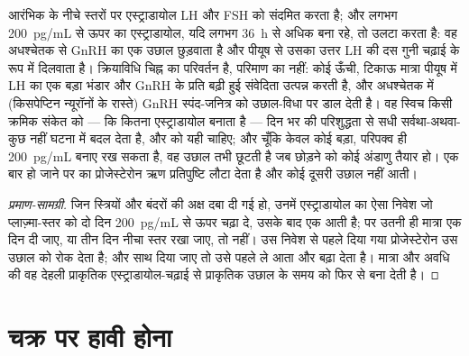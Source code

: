 \begin{theorem}[ऋण से धन प्रतिपुष्टि तक का स्विच]\label{thm:b2:reproductive-hormones:switch}
आरंभिक  के नीचे स्तरों पर एस्ट्राडायोल
LH और FSH को संदमित करता है; और लगभग \qty{200}{pg/mL} से ऊपर का
एस्ट्राडायोल, यदि लगभग \qty{36}{h} से अधिक बना रहे, तो उलटा करता है:
वह अधश्चेतक से GnRH का एक उछाल छुड़वाता है और पीयूष से उसका उत्तर
LH की दस गुनी चढ़ाई के रूप में दिलवाता है। क्रियाविधि चिह्न का परिवर्तन
है, परिमाण का नहीं: कोई ऊँची, टिकाऊ मात्रा पीयूष में LH का एक
बड़ा भंडार और GnRH के प्रति बढ़ी हुई संवेदिता उत्पन्न करती है, और
अधश्चेतक में (किसपेप्टिन न्यूरॉनों के रास्ते) GnRH स्पंद-जनित्र को
उछाल-विधा पर डाल देती है। वह स्विच किसी क्रमिक संकेत को --- कि
 कितना एस्ट्राडायोल बनाता है --- दिन भर की परिशुद्धता से
सधी सर्वथा-अथवा-कुछ नहीं घटना में बदल देता है, और 
को यही चाहिए; और चूँकि केवल कोई बड़ा, परिपक्व  ही
\qty{200}{pg/mL} बनाए रख सकता है, वह उछाल तभी छूटती है जब छोड़ने को कोई
अंडाणु तैयार हो। एक बार  हो जाने पर  का
प्रोजेस्टेरोन ऋण प्रतिपुष्टि लौटा देता है और कोई दूसरी उछाल नहीं
आती।
\end{theorem}
\begin{proof}[प्रमाण-सामग्री]
जिन स्त्रियों और बंदरों की अक्ष दबा दी गई हो, उनमें
एस्ट्राडायोल का ऐसा निवेश जो प्लाज़्मा-स्तर को दो दिन \qty{200}{pg/mL}
से ऊपर चढ़ा दे, उसके बाद एक  आती है; पर उतनी ही मात्रा एक
दिन दी जाए, या तीन दिन नीचा स्तर रखा जाए, तो नहीं। उस निवेश से पहले
दिया गया प्रोजेस्टेरोन उस उछाल को रोक देता है; और साथ दिया जाए तो उसे
पहले ले आता और बढ़ा देता है। मात्रा और अवधि की वह देहली प्राकृतिक
एस्ट्राडायोल-चढ़ाई से प्राकृतिक उछाल के समय को फिर से बना देती है।
\end{proof}

\section{चक्र पर हावी होना}

